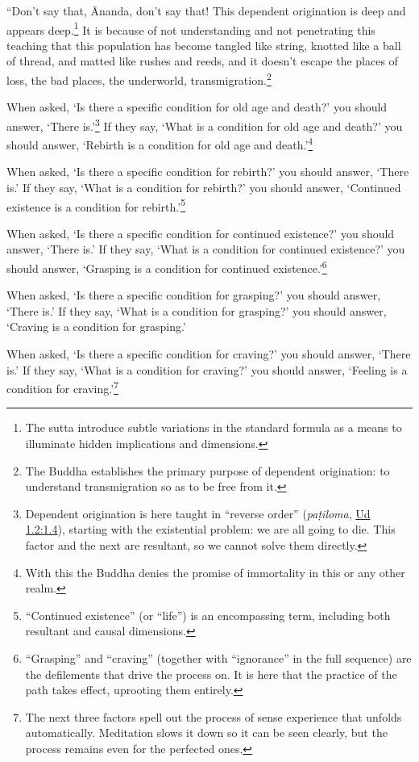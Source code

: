 \documentclass[12pt,openany]{book}%
\begin{document}
“Don’t say that, Ānanda, don’t say that! This dependent origination is deep and appears deep.\footnote{The sutta introduce subtle variations in the standard formula as a means to illuminate hidden implications and dimensions. } It is because of not understanding and not penetrating this teaching that this population has become tangled like string, knotted like a ball of thread, and matted like rushes and reeds, and it doesn’t escape the places of loss, the bad places, the underworld, transmigration.\footnote{The Buddha establishes the primary purpose of dependent origination: to understand transmigration so as to be free from it. } 

When asked, ‘Is there a specific condition for old age and death?’ you should answer, ‘There is.’\footnote{Dependent origination is here taught in “reverse order” (\textit{\textsanskrit{paṭiloma}}, \href{https://suttacentral.net/ud1.2/en/sujato\#1.4}{Ud 1.2:1.4}), starting with the existential problem: we are all going to die. This factor and the next are resultant, so we cannot solve them directly. } If they say, ‘What is a condition for old age and death?’ you should answer, ‘Rebirth is a condition for old age and death.’\footnote{With this the Buddha denies the promise of immortality in this or any other realm. } 

When asked, ‘Is there a specific condition for rebirth?’ you should answer, ‘There is.’ If they say, ‘What is a condition for rebirth?’ you should answer, ‘Continued existence is a condition for rebirth.’\footnote{“Continued existence” (or “life”) is an encompassing term, including both resultant and causal dimensions. } 

When asked, ‘Is there a specific condition for continued existence?’ you should answer, ‘There is.’ If they say, ‘What is a condition for continued existence?’ you should answer, ‘Grasping is a condition for continued existence.’\footnote{“Grasping” and “craving” (together with “ignorance” in the full sequence) are the defilements that drive the process on. It is here that the practice of the path takes effect, uprooting them entirely. } 

When asked, ‘Is there a specific condition for grasping?’ you should answer, ‘There is.’ If they say, ‘What is a condition for grasping?’ you should answer, ‘Craving is a condition for grasping.’ 

When asked, ‘Is there a specific condition for craving?’ you should answer, ‘There is.’ If they say, ‘What is a condition for craving?’ you should answer, ‘Feeling is a condition for craving.’\footnote{The next three factors spell out the process of sense experience that unfolds automatically. Meditation slows it down so it can be seen clearly, but the process remains even for the perfected ones. } 
\end{document}
